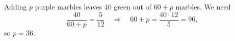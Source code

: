 Adding $p$ purple marbles leaves $40$ green out of $60+p$ marbles. We need
\[
\dfrac{40}{60+p}=\dfrac{5}{12}\quad\Longrightarrow\quad 60+p=\dfrac{40\cdot12}{5}=96 ,
\]
so $p=\boxed{36}$.
